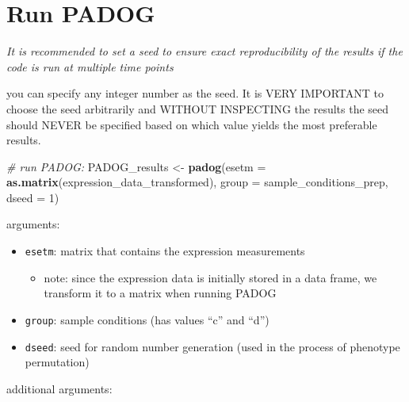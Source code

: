 \documentclass[
]{book}
\newenvironment{Shaded}{\begin{snugshade}}{\end{snugshade}}
\newcommand{\AttributeTok}[1]{\textcolor[rgb]{0.13,0.29,0.53}{#1}}
\newcommand{\CommentTok}[1]{\textcolor[rgb]{0.56,0.35,0.01}{\textit{#1}}}
\newcommand{\DecValTok}[1]{\textcolor[rgb]{0.00,0.00,0.81}{#1}}
\newcommand{\FunctionTok}[1]{\textcolor[rgb]{0.13,0.29,0.53}{\textbf{#1}}}
\newcommand{\NormalTok}[1]{#1}
\newcommand{\OtherTok}[1]{\textcolor[rgb]{0.56,0.35,0.01}{#1}}
\providecommand{\tightlist}{%
  \setlength{\itemsep}{0pt}\setlength{\parskip}{0pt}}
\begin{document}
\hypertarget{run-padog}{%
\section{Run PADOG}\label{run-padog}}

\emph{It is recommended to set a seed to ensure exact reproducibility of the results if the code is run at multiple time points}

you can specify any integer number as the seed. It is VERY IMPORTANT to choose the seed arbitrarily and WITHOUT INSPECTING the results the seed should NEVER be specified based on which value yields the most preferable results.

\begin{Shaded}
\begin{Highlighting}[]
\CommentTok{\# run PADOG: }
\NormalTok{ PADOG\_results }\OtherTok{\textless{}{-}} \FunctionTok{padog}\NormalTok{(}\AttributeTok{esetm =} \FunctionTok{as.matrix}\NormalTok{(expression\_data\_transformed), }
                        \AttributeTok{group =}\NormalTok{ sample\_conditions\_prep, }
                        \AttributeTok{dseed =} \DecValTok{1}\NormalTok{)}
\end{Highlighting}
\end{Shaded}

arguments:

\begin{itemize}
\tightlist
\item
  \texttt{esetm}: matrix that contains the expression measurements

  \begin{itemize}
  \tightlist
  \item
    note: since the expression data is initially stored in a data frame, we transform it to a matrix when running PADOG
  \end{itemize}
\item
  \texttt{group}: sample conditions (has values ``c'' and ``d'')
\item
  \texttt{dseed}: seed for random number generation (used in the process of phenotype permutation)
\end{itemize}

additional arguments:
\end{document}
